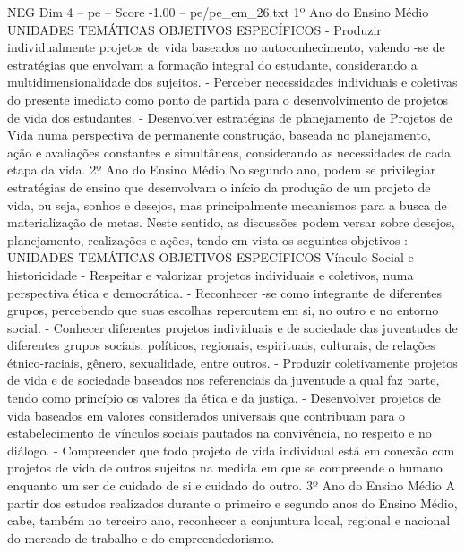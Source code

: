 \begin{textsample}{NEG Dim 4 – pe – Score -1.00 – pe/pe\_em\_26.txt}  \label{ex:f4_neg_017}
1º Ano do Ensino Médio UNIDADES TEMÁTICAS OBJETIVOS ESPECÍFICOS - Produzir individualmente projetos de vida baseados no autoconhecimento, valendo -se de estratégias que envolvam a formação integral do estudante, considerando a multidimensionalidade dos sujeitos. - Perceber necessidades individuais e coletivas do presente imediato como ponto de partida para o desenvolvimento de projetos de vida dos estudantes. - Desenvolver estratégias de planejamento de Projetos de Vida numa perspectiva de permanente construção, baseada no planejamento, ação e avaliações constantes e simultâneas, considerando as necessidades de cada etapa da vida. 2º Ano do Ensino Médio No segundo ano, podem se privilegiar estratégias de ensino que desenvolvam o início da produção de um projeto de vida, ou seja, sonhos e desejos, mas principalmente mecanismos para a busca de materialização de metas.
Neste sentido, as discussões podem versar sobre desejos, planejamento, realizações e ações, tendo em vista os seguintes objetivos : UNIDADES TEMÁTICAS OBJETIVOS ESPECÍFICOS Vínculo Social e historicidade - Respeitar e valorizar projetos individuais e coletivos, numa perspectiva ética e democrática. - Reconhecer -se como integrante de diferentes grupos, percebendo que suas escolhas repercutem em si, no outro e no entorno social. - Conhecer diferentes projetos individuais e de sociedade das juventudes de diferentes grupos sociais, políticos, regionais, espirituais, culturais, de relações étnico-raciais, gênero, sexualidade, entre outros. - Produzir coletivamente projetos de vida e de sociedade baseados nos referenciais da juventude a qual faz parte, tendo como princípio os valores da ética e da justiça. - Desenvolver projetos de vida baseados em valores considerados universais que contribuam para o estabelecimento de vínculos sociais pautados na convivência, no respeito e no diálogo. - Compreender que todo projeto de vida individual está em conexão com projetos de vida de outros sujeitos na medida em que se compreende o humano enquanto um ser de cuidado de si e cuidado do outro. 3º Ano do Ensino Médio A partir dos estudos realizados durante o primeiro e segundo anos do Ensino Médio, cabe, também no terceiro ano, reconhecer a conjuntura local, regional e nacional do mercado de trabalho e do empreendedorismo.

\end{textsample}
